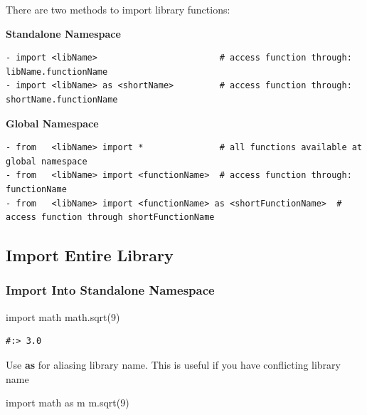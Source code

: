 \documentclass[
]{book}
\newenvironment{Shaded}{\begin{snugshade}}{\end{snugshade}}
\newcommand{\DecValTok}[1]{\textcolor[rgb]{0.06,0.06,0.06}{#1}}
\newcommand{\ImportTok}[1]{#1}
\newcommand{\NormalTok}[1]{#1}
\begin{document}
There are two methods to import library functions:

\textbf{Standalone Namespace}

\begin{verbatim}
- import <libName>                        # access function through: libName.functionName
- import <libName> as <shortName>         # access function through: shortName.functionName
\end{verbatim}

\textbf{Global Namespace}

\begin{verbatim}
- from   <libName> import *               # all functions available at global namespace
- from   <libName> import <functionName>  # access function through: functionName    
- from   <libName> import <functionName> as <shortFunctionName>  # access function through shortFunctionName
\end{verbatim}

\hypertarget{import-entire-library}{%
\subsection{Import Entire Library}\label{import-entire-library}}

\hypertarget{import-into-standalone-namespace}{%
\subsubsection{Import Into Standalone Namespace}\label{import-into-standalone-namespace}}

\begin{Shaded}
\begin{Highlighting}[]
\ImportTok{import}\NormalTok{ math}
\NormalTok{math.sqrt(}\DecValTok{9}\NormalTok{)}
\end{Highlighting}
\end{Shaded}

\begin{verbatim}
#:> 3.0
\end{verbatim}

Use \textbf{as} for aliasing library name. This is useful if you have conflicting library name

\begin{Shaded}
\begin{Highlighting}[]
\ImportTok{import}\NormalTok{ math }\ImportTok{as}\NormalTok{ m}
\NormalTok{m.sqrt(}\DecValTok{9}\NormalTok{)}
\end{Highlighting}
\end{Shaded}
\end{document}
